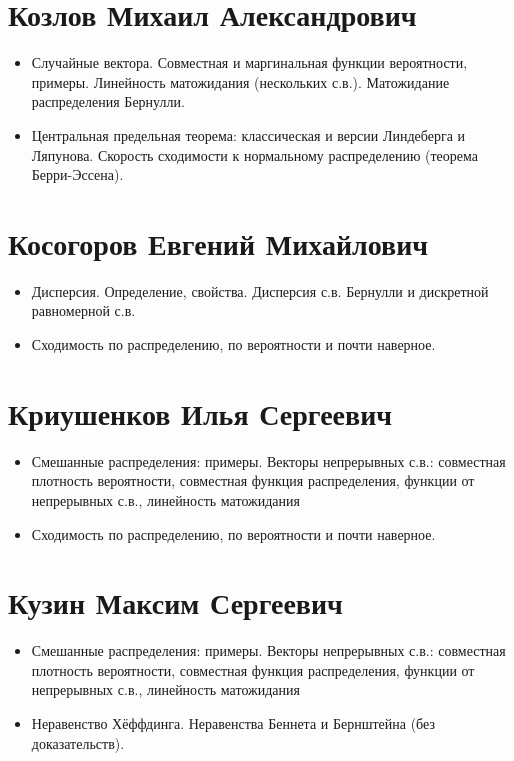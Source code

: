 \documentclass[12pt]{article}
\begin{document}
\section{Козлов Михаил Александрович}

\begin{itemize}
  \item Случайные вектора. Совместная и маргинальная функции вероятности, примеры. Линейность матожидания (нескольких с.в.). Матожидание распределения Бернулли.
  \item Центральная предельная теорема: классическая и версии Линдеберга и Ляпунова. Скорость сходимости к нормальному распределению (теорема Берри-Эссена).
\end{itemize}

\section{Косогоров Евгений Михайлович}

\begin{itemize}
  \item Дисперсия. Определение, свойства. Дисперсия с.в. Бернулли и дискретной равномерной с.в.
  \item Сходимость по распределению, по вероятности и почти наверное.
\end{itemize}

\section{Криушенков Илья Сергеевич}

\begin{itemize}
  \item Смешанные распределения: примеры. Векторы непрерывных с.в.: совместная плотность вероятности, совместная функция распределения, функции от непрерывных с.в., линейность матожидания
  \item Сходимость по распределению, по вероятности и почти наверное.
\end{itemize}

\section{Кузин Максим Сергеевич}

\begin{itemize}
  \item Смешанные распределения: примеры. Векторы непрерывных с.в.: совместная плотность вероятности, совместная функция распределения, функции от непрерывных с.в., линейность матожидания
  \item Неравенство Хёффдинга. Неравенства Беннета и Бернштейна (без доказательств).
\end{itemize}
\end{document}
